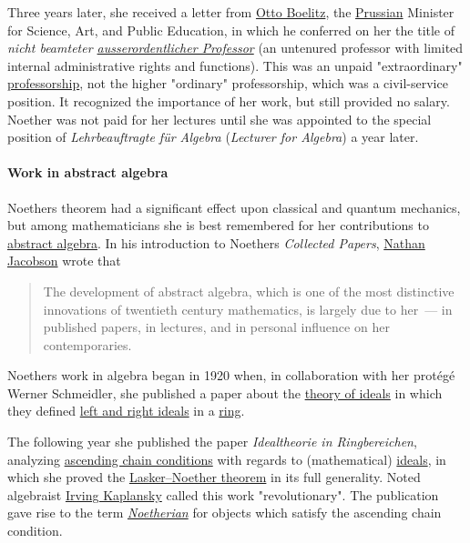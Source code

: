 Three years later, she received a letter from \href{https://en.wikipedia.org/wiki/Otto_Boelitz?action=edit&redlink=1}{Otto Boelitz}, the \href{https://en.wikipedia.org/wiki/Prussia}{Prussian} Minister for Science, Art, and Public Education, in which he conferred on her the title of \emph{nicht beamteter \href{https://en.wikipedia.org/wiki/Ausserordentlicher_Professor}{ausserordentlicher Professor}} (an untenured professor with limited internal administrative rights and functions). This was an unpaid "extraordinary" \href{https://en.wikipedia.org/wiki/Professor}{professorship}, not the higher "ordinary" professorship, which was a civil-service position. It recognized the importance of her work, but still provided no salary. Noether was not paid for her lectures until she was appointed to the special position of \emph{Lehrbeauftragte für Algebra} (\emph{Lecturer for Algebra}) a year later.


\paragraph{Work in abstract algebra}\label{Work_in_abstract_algebra}

Noether\textquotesingle s theorem had a significant effect upon classical and quantum mechanics, but among mathematicians she is best remembered for her contributions to \href{https://en.wikipedia.org/wiki/Abstract_algebra}{abstract algebra}. In his introduction to Noether\textquotesingle s \emph{Collected Papers}, \href{https://en.wikipedia.org/wiki/Nathan_Jacobson}{Nathan Jacobson} wrote that

\begin{quote}
The development of abstract algebra, which is one of the most distinctive innovations of twentieth century mathematics, is largely due to her{~}--- in published papers, in lectures, and in personal influence on her contemporaries.
\end{quote}

Noether\textquotesingle s work in algebra began in 1920 when, in collaboration with her protégé Werner Schmeidler, she published a paper about the \href{https://en.wikipedia.org/wiki/Ideal_theory}{theory of ideals} in which they defined \href{https://en.wikipedia.org/wiki/Ideal_(ring_theory)}{left and right ideals} in a \href{https://en.wikipedia.org/wiki/Ring_(mathematics)}{ring}.

The following year she published the paper \emph{Idealtheorie in Ringbereichen}, analyzing \href{https://en.wikipedia.org/wiki/Ascending_chain_condition}{ascending chain conditions} with regards to (mathematical) \href{https://en.wikipedia.org/wiki/Ideal_(ring_theory)}{ideals}, in which she proved the \href{https://en.wikipedia.org/wiki/Lasker–Noether_theorem}{Lasker--Noether theorem} in its full generality. Noted algebraist \href{https://en.wikipedia.org/wiki/Irving_Kaplansky}{Irving Kaplansky} called this work "revolutionary". The publication gave rise to the term \emph{\href{https://en.wikipedia.org/wiki/Noetherian}{Noetherian}} for objects which satisfy the ascending chain condition.


